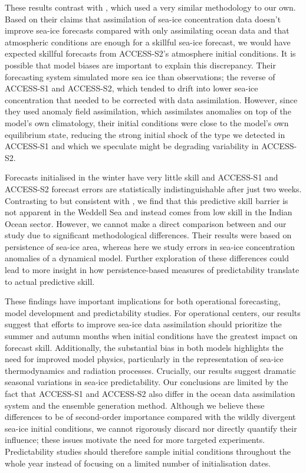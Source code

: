\documentclass[tc, manuscript]{copernicus}
\begin{document}
These results contrast with \citet{xiu2025}, which used a very similar
methodology to our own. Based on their claims that assimilation of
sea-ice concentration data doesn't improve sea-ice forecasts compared
with only assimilating ocean data and that atmospheric conditions are
enough for a skillful sea-ice forecast, we would have expected skillful
forecasts from ACCESS-S2's atmosphere initial conditions. It is possible
that model biases are important to explain this discrepancy. Their
forecasting system simulated more sea ice than observations; the reverse
of ACCESS-S1 and ACCESS-S2, which tended to drift into lower sea-ice
concentration that needed to be corrected with data assimilation.
However, since they used anomaly field assimilation, which assimilates
anomalies on top of the model's own climatology, their initial
conditions were close to the model's own equilibrium state, reducing the
strong initial shock of the type we detected in ACCESS-S1 and which we
speculate might be degrading variability in ACCESS-S2.

Forecasts initialised in the winter have very little skill and ACCESS-S1
and ACCESS-S2 forecast errors are statistically indistinguishable after
just two weeks. Contrasting to \citet{libera2022} but consistent with
\citet{xiu2025}, we find that this predictive skill barrier is not
apparent in the Weddell Sea and instead comes from low skill in the
Indian Ocean sector. However, we cannot make a direct comparison between
\citet{libera2022} and our study due to significant methodological
differences. Their results were based on persistence of sea-ice area,
whereas here we study errors in sea-ice concentration anomalies of a
dynamical model. Further exploration of these differences could lead to
more insight in how persistence-based measures of predictability
translate to actual predictive skill.

These findings have important implications for both operational
forecasting, model development and predictability studies. For
operational centers, our results suggest that efforts to improve sea-ice
data assimilation should prioritize the summer and autumn months when
initial conditions have the greatest impact on forecast skill.
Additionally, the substantial bias in both models highlights the need
for improved model physics, particularly in the representation of
sea-ice thermodynamics and radiation processes. Crucially, our results
suggest dramatic seasonal variations in sea-ice predictability. Our
conclusions are limited by the fact that ACCESS-S1 and ACCESS-S2 also
differ in the ocean data assimilation system and the ensemble generation
method. Although we believe these differences to be of second-order
importance compared with the wildly divergent sea-ice initial
conditions, we cannot rigorously discard nor directly quantify their
influence; these issues motivate the need for more targeted experiments.
Predictability studies should therefore sample initial conditions
throughout the whole year instead of focusing on a limited number of
initialisation dates.
\end{document}
